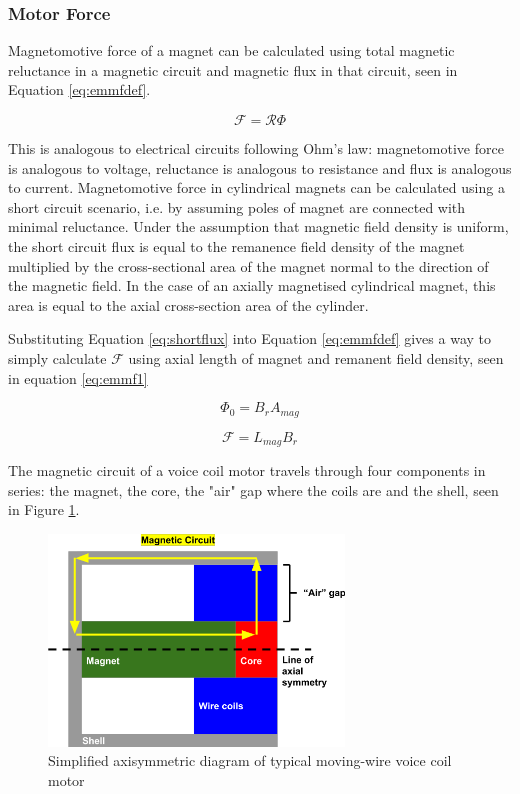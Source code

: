 \documentclass[a4paper,12pt]{article}
\begin{document}
\subsubsection{Motor Force}
Magnetomotive force of a magnet can be calculated using total magnetic reluctance in a magnetic circuit and magnetic flux in that circuit, seen in Equation \ref{eq:emmfdef}.

\begin{equation} \label{eq:emmfdef}
    \mathcal{F}=\mathcal{R} \Phi
\end{equation}

This is analogous to electrical circuits following Ohm's law: magnetomotive force is analogous to voltage, reluctance is analogous to resistance and flux is analogous to current. Magnetomotive force in cylindrical magnets can be calculated using a short circuit scenario, i.e. by assuming poles of magnet are connected with minimal reluctance. Under the assumption that magnetic field density is uniform, the short circuit flux is equal to the remanence field density of the magnet multiplied by the cross-sectional area of the magnet normal to the direction of the magnetic field. In the case of an axially magnetised cylindrical magnet, this area is equal to the axial cross-section area of the cylinder.

Substituting Equation \ref{eq:shortflux} into Equation \ref{eq:emmfdef} gives a way to simply calculate $\mathcal{F}$ using axial length of magnet and remanent field density, seen in equation \ref{eq:emmf1}

\begin{equation} \label{eq:shortflux}
    \Phi_0 = B_rA_{mag}
\end{equation}

\begin{equation} \label{eq:emmf1}
        \mathcal{F} = L_{mag} B_r
\end{equation}

The magnetic circuit of a voice coil motor travels through four components in series: the magnet, the core, the "air" gap where the coils are and the shell, seen in Figure \ref{fg:simplemotor}.

\begin{figure}[h!]
    \centering
    \includegraphics[width=0.7\textwidth]{simplifiedMotor.png}
    \caption{Simplified axisymmetric diagram of typical moving-wire voice coil motor}
    \label{fg:simplemotor}
\end{figure}
\end{document}
